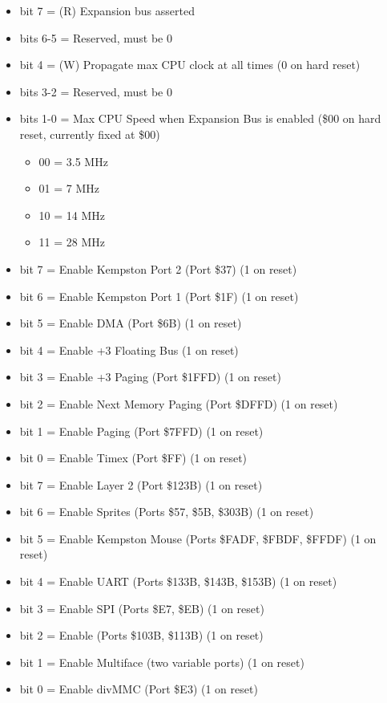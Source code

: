\begin{itemize}
\item bit 7 = (R) Expansion bus  asserted
\item bits 6-5 = Reserved, must be 0
\item bit 4 = (W) Propagate max CPU clock at all times (0 on hard
  reset)
\item bits 3-2 = Reserved, must be 0
\item bits 1-0 = Max CPU Speed when Expansion Bus is enabled (\$00 on
  hard reset, currently fixed at \$00)
  \begin{itemize}
  \item 00 = 3.5 MHz
  \item 01 = 7 MHz
  \item 10 = 14 MHz
  \item 11 = 28 MHz
  \end{itemize}
\end{itemize}

\begin{itemize}
\item bit 7 = Enable Kempston Port 2 (Port \$37) (1 on reset)
\item bit 6 = Enable Kempston Port 1 (Port \$1F) (1 on reset)
\item bit 5 = Enable DMA (Port \$6B) (1 on reset)
\item bit 4 = Enable +3 Floating Bus (1 on reset)
\item bit 3 = Enable +3 Paging (Port \$1FFD) (1 on reset)
\item bit 2 = Enable Next Memory Paging (Port \$DFFD) (1 on reset)
\item bit 1 = Enable Paging (Port \$7FFD) (1 on reset)
\item bit 0 = Enable Timex (Port \$FF) (1 on reset)
\end{itemize}

\begin{itemize}
\item bit 7 = Enable Layer 2 (Port \$123B) (1 on reset)
\item bit 6 = Enable Sprites (Ports \$57, \$5B, \$303B) (1 on reset)
\item bit 5 = Enable Kempston Mouse (Ports \$FADF, \$FBDF, \$FFDF) (1
  on reset)
\item bit 4 = Enable UART (Ports \$133B, \$143B, \$153B) (1 on reset)
\item bit 3 = Enable SPI (Ports \$E7, \$EB) (1 on reset)
\item bit 2 = Enable \iic (Ports \$103B, \$113B) (1 on reset)
\item bit 1 = Enable Multiface (two variable ports) (1 on reset)
\item bit 0 = Enable divMMC (Port \$E3) (1 on reset)
\end{itemize}

